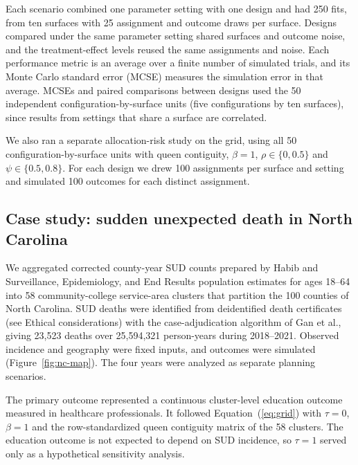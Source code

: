 \documentclass[Afour,sagev,times]{sagej}
\begin{document}
Each scenario combined one parameter setting with one design and had 250 fits, from ten surfaces with 25 assignment and outcome draws per surface. Designs compared under the same parameter setting shared surfaces and outcome noise, and the treatment-effect levels reused the same assignments and noise. Each performance metric is an average over a finite number of simulated trials, and its Monte Carlo standard error (MCSE) measures the simulation error in that average.\cite{morris_using_2019} MCSEs and paired comparisons between designs used the 50 independent configuration-by-surface units (five configurations by ten surfaces), since results from settings that share a surface are correlated.

We also ran a separate allocation-risk study on the grid, using all 50 configuration-by-surface units with queen contiguity, $\beta=1$, $\rho\in\{0,0.5\}$ and $\psi\in\{0.5,0.8\}$. For each design we drew 100 assignments per surface and setting and simulated 100 outcomes for each distinct assignment.

\subsection{Case study: sudden unexpected death in North Carolina}
We aggregated corrected county-year SUD counts prepared by Habib\cite{habib_temporal_2026} and Surveillance, Epidemiology, and End Results population estimates for ages 18--64\cite{seer_population_data} into 58 community-college service-area clusters that partition the 100 counties of North Carolina. SUD deaths were identified from deidentified death certificates (see Ethical considerations) with the case-adjudication algorithm of Gan et al.,\cite{gan_factors_2019} giving 23,523 deaths over 25,594,321 person-years during 2018--2021. Observed incidence and geography were fixed inputs, and outcomes were simulated (Figure~\ref{fig:nc-map}). The four years were analyzed as separate planning scenarios.
\ifctjreading
\CTJMapFigure
\fi

The primary outcome represented a continuous cluster-level education outcome measured in healthcare professionals. It followed Equation~(\ref{eq:grid}) with $\tau=0$, $\beta=1$ and the row-standardized queen contiguity matrix of the 58 clusters. The education outcome is not expected to depend on SUD incidence, so $\tau=1$ served only as a hypothetical sensitivity analysis.
\end{document}
